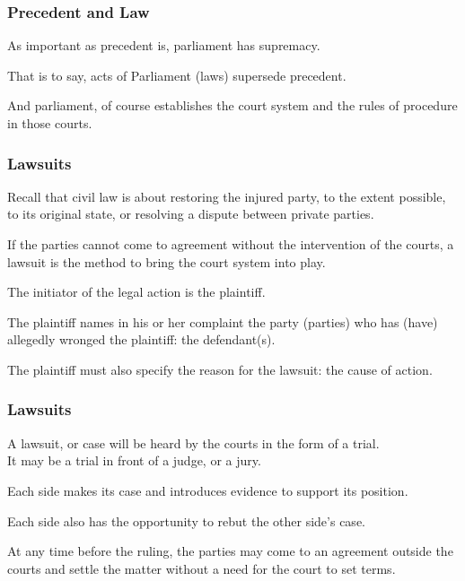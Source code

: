 \begin{frame}
\frametitle{Precedent and Law}

As important as precedent is, parliament has supremacy.

That is to say, acts of Parliament (laws) supersede precedent. 

And parliament, of course establishes the court system and the rules of procedure in those courts.

\end{frame}



\begin{frame}
\frametitle{Lawsuits}

Recall that civil law is about restoring the injured party, to the extent possible, to its original state, or resolving a dispute between private parties.

If the parties cannot come to agreement without the intervention of the courts, a \alert{lawsuit} is the method to bring the court system into play.

The initiator of the legal action is the \alert{plaintiff}.

The plaintiff names in his or her complaint the party (parties) who has (have) allegedly wronged the plaintiff: the \alert{defendant(s)}.

The plaintiff must also specify the reason for the lawsuit: the \alert{cause of action}.

\end{frame}



\begin{frame}
\frametitle{Lawsuits}

A lawsuit, or \alert{case} will be heard by the courts in the form of a \alert{trial}.\\
\quad It may be a trial in front of a judge, or a jury.

Each side makes its case and introduces evidence to support its position.

Each side also has the opportunity to rebut the other side's case.

At any time before the ruling, the parties may come to an agreement outside the courts and \alert{settle} the matter without a need for the court to set terms.

\end{frame}



